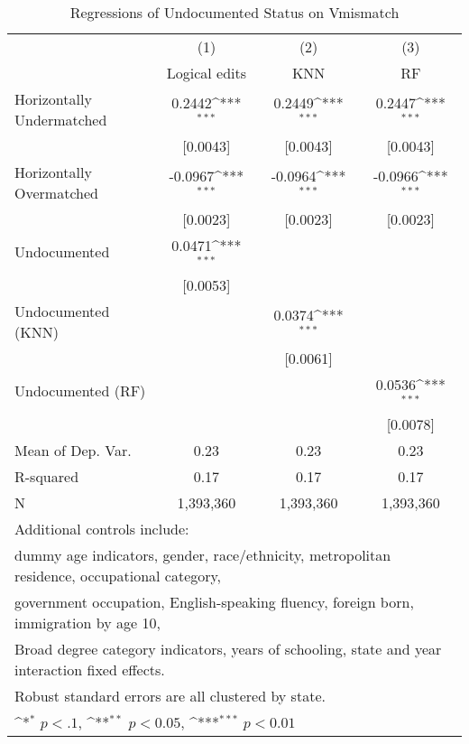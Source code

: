 \begin{table}[htbp]\centering
\def\sym#1{\ifmmode^{#1}\else\(^{#1}\)\fi}
\caption{Regressions of Undocumented Status on Vmismatch}
\begin{tabular}{l*{3}{c}}
\toprule
                    &\multicolumn{1}{c}{(1)}         &\multicolumn{1}{c}{(2)}         &\multicolumn{1}{c}{(3)}         \\
                    &Logical edits         &         KNN         &          RF         \\
\midrule
Horizontally Undermatched&      0.2442\sym{***}&      0.2449\sym{***}&      0.2447\sym{***}\\
                    &    [0.0043]         &    [0.0043]         &    [0.0043]         \\
\addlinespace
Horizontally Overmatched&     -0.0967\sym{***}&     -0.0964\sym{***}&     -0.0966\sym{***}\\
                    &    [0.0023]         &    [0.0023]         &    [0.0023]         \\
\addlinespace
Undocumented        &      0.0471\sym{***}&                     &                     \\
                    &    [0.0053]         &                     &                     \\
\addlinespace
Undocumented (KNN)  &                     &      0.0374\sym{***}&                     \\
                    &                     &    [0.0061]         &                     \\
\addlinespace
Undocumented (RF)   &                     &                     &      0.0536\sym{***}\\
                    &                     &                     &    [0.0078]         \\
\midrule
Mean of Dep. Var.   &        0.23         &        0.23         &        0.23         \\
R-squared           &        0.17         &        0.17         &        0.17         \\
N                   &   1,393,360         &   1,393,360         &   1,393,360         \\
\bottomrule
\multicolumn{4}{l}{\footnotesize Additional controls include:}\\
\multicolumn{4}{l}{\footnotesize dummy age indicators, gender, race/ethnicity, metropolitan residence, occupational category,}\\
\multicolumn{4}{l}{\footnotesize government occupation, English-speaking fluency, foreign born, immigration by age 10,}\\
\multicolumn{4}{l}{\footnotesize Broad degree category indicators, years of schooling, state and year interaction fixed effects.}\\
\multicolumn{4}{l}{\footnotesize Robust standard errors are all clustered by state.}\\
\multicolumn{4}{l}{\footnotesize \sym{*} \(p<.1\), \sym{**} \(p<0.05\), \sym{***} \(p<0.01\)}\\
\end{tabular}
\end{table}
